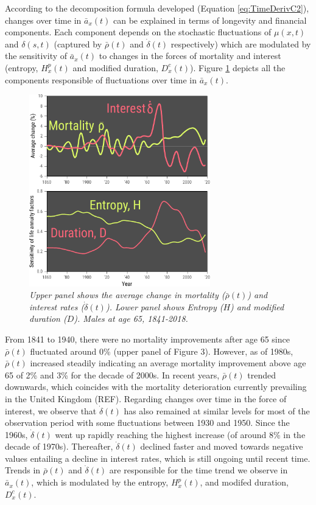 \documentclass[12pt]{article}
\begin{document}
According to the decomposition formula developed (Equation \ref{eq:TimeDerivC2}), changes over time in $\bar{a}_x(t)$ can be explained in terms of longevity and financial components. Each component depends on the stochastic fluctuations of $\mu(x,t)$ and $\delta(s,t)$ (captured by $\bar{\rho}(t)$ and $\dot{\delta}(t)$ respectively) which are modulated by the sensitivity of $\bar{a}_x(t)$ to changes in the forces of mortality and interest (entropy, ${H}^{p}_x(t)$ and modified duration, ${D}^{c}_x(t)$). Figure \ref{fig:Fig3} depicts all the components responsible of fluctuations over time in $\bar{a}_x(t)$.




\begin{figure}[!ht]
	\centering
	\includegraphics[width=0.7\textwidth]{Fig/Fig3}
	\caption{\textit{Upper panel shows the average change in mortality ($\bar{\rho}(t)$) and interest rates ($\dot{\delta}(t)$). Lower panel shows Entropy ($H$) and modified duration ($D$). Males at age 65, 1841-2018.}}
	\label{fig:Fig3}
\end{figure}


From 1841 to 1940, there were no mortality improvements after age 65 since $\bar{\rho}(t)$ fluctuated around 0\% (upper panel of Figure 3). However, as of 1980s, $\bar{\rho}(t)$ increased steadily indicating an average mortality improvement above age 65 of 2\% and 3\% for the decade of 2000s. In recent years, $\bar{\rho}(t)$ trended downwards, which coincides with the mortality deterioration currently prevailing in the United Kingdom (REF). Regarding changes over time in the force of interest, we observe that $\dot{\delta}(t)$ has also remained at similar levels for most of the observation period with some fluctuations between 1930 and 1950. Since the 1960s, $\dot{\delta}(t)$ went up rapidly reaching the highest increase (of around 8\% in the decade of 1970s). Thereafter, $\dot{\delta}(t)$ declined faster and moved towards negative values entailing a decline in interest rates, which is still ongoing until recent time. Trends in $\bar{\rho}(t)$ and $\dot{\delta}(t)$ are responsible for the time trend we observe in $\bar{a}_x(t)$, which is modulated by the entropy, ${H}^{p}_x(t)$, and modifed duration, ${D}^{c}_x(t)$.
\end{document}
